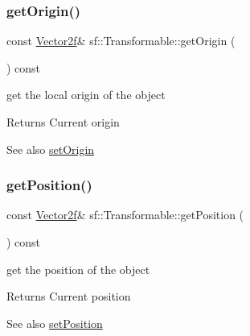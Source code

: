 \subsubsection{\texorpdfstring{getOrigin()}{getOrigin()}}
{\footnotesize\ttfamily const \mbox{\hyperlink{classsf_1_1_vector2}{Vector2f}}\& sf\+::\+Transformable\+::get\+Origin (\begin{DoxyParamCaption}{ }\end{DoxyParamCaption}) const}



get the local origin of the object 

\begin{DoxyReturn}{Returns}
Current origin
\end{DoxyReturn}
\begin{DoxySeeAlso}{See also}
\mbox{\hyperlink{classsf_1_1_transformable_a56c67bd80aae8418d13fb96c034d25ec}{set\+Origin}} \begin{DoxyVerb}\end{DoxyVerb}
 
\end{DoxySeeAlso}
\mbox{\label{classsf_1_1_transformable_a73f9739bc6e74db2cea154bc8e94ec46}} 
\subsubsection{\texorpdfstring{getPosition()}{getPosition()}}
{\footnotesize\ttfamily const \mbox{\hyperlink{classsf_1_1_vector2}{Vector2f}}\& sf\+::\+Transformable\+::get\+Position (\begin{DoxyParamCaption}{ }\end{DoxyParamCaption}) const}



get the position of the object 

\begin{DoxyReturn}{Returns}
Current position
\end{DoxyReturn}
\begin{DoxySeeAlso}{See also}
\mbox{\hyperlink{classsf_1_1_transformable_a4dbfb1a7c80688b0b4c477d706550208}{set\+Position}} \begin{DoxyVerb}\end{DoxyVerb}
 
\end{DoxySeeAlso}
\mbox{\label{classsf_1_1_transformable_aa00b5c5d4a06ac24a94dd72c56931d3a}} 
